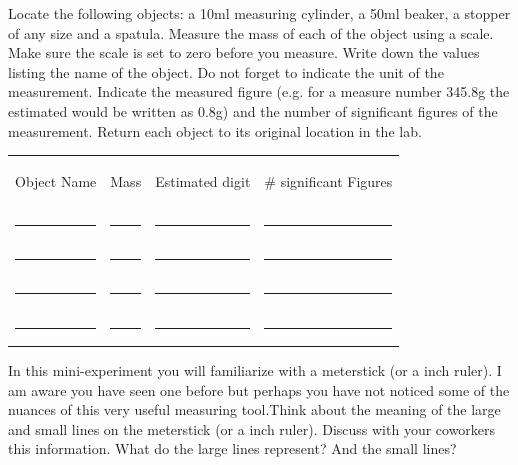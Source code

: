 \documentclass[main.tex]{subfiles}
\begin{document}
\begin{steps}
    \newstep[] Locate the following objects: a 10ml measuring cylinder, a 50ml beaker, a stopper of any size and a spatula.     
    \newstep[] Measure the mass of each of the object using a scale. Make sure the scale is set to zero before you measure. 
    \newstep[]Write down the values listing the name of the object. Do not forget to indicate the unit of the measurement.
    \newstep[] Indicate the measured figure (e.g. for a measure number 345.8g the estimated would be written as 0.8g) and the number of significant figures of the measurement.
     \newstep[] Return each object to its original location in the lab.
\end{steps}

\begin{center} \begin{tabular}{ p{5cm} p{3cm} p{3cm}p{3cm}   }
   \begin{bf}Object Name\end{bf} & \begin{bf}Mass\end{bf} &\begin{bf}Estimated digit\end{bf} &\begin{bf}\# significant Figures\end{bf} \\[0.1cm]     
  \rule{5cm}{0.4pt} 				&\rule{3cm}{0.4pt}&\rule{3cm}{0.4pt}&\rule{3cm}{0.4pt}  \\[0.2cm]      
  \rule{5cm}{0.4pt} 				&\rule{3cm}{0.4pt}&\rule{3cm}{0.4pt}&\rule{3cm}{0.4pt}  \\[0.2cm]      
  \rule{5cm}{0.4pt} 				&\rule{3cm}{0.4pt}&\rule{3cm}{0.4pt}&\rule{3cm}{0.4pt}  \\[0.2cm]      
  \rule{5cm}{0.4pt} 				&\rule{3cm}{0.4pt}&\rule{3cm}{0.4pt}&\rule{3cm}{0.4pt}  \\[0.2cm]      
 \end{tabular}\end{center}


\vspace{0.2cm}{\large \bfseries 2. Measuring length}
In this mini-experiment you will familiarize with a meterstick (or a inch ruler). I am aware you have seen one before but perhaps you have not noticed some of the nuances of this very useful measuring tool.Think about the meaning of the large and small lines on the meterstick (or a inch ruler). Discuss with your coworkers this information. What do the large lines represent? And the small lines?
\end{document}
